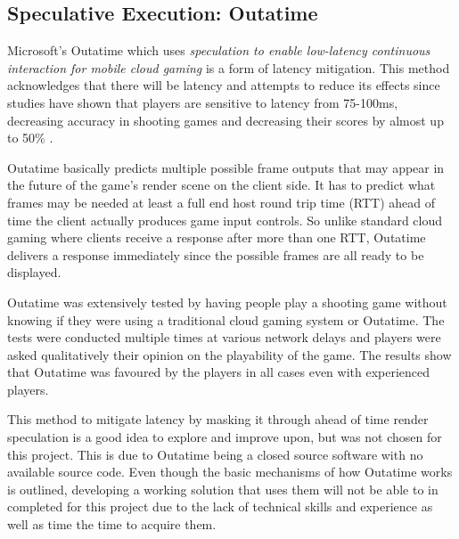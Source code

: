 \subsection{Speculative Execution: Outatime}
Microsoft's Outatime which uses \textit{speculation to enable low-latency continuous interaction for mobile cloud gaming} \cite{lee2015outatime} is a form of latency mitigation. This method acknowledges that there will be latency and attempts to reduce its effects since studies have shown that players are sensitive to latency from 75-100ms, decreasing accuracy in shooting games and decreasing their scores by almost up to 50\% \cite{beigbeder2004effects}.
\newline 
\par
Outatime basically predicts multiple possible frame outputs that may appear in the future of the game's render scene on the client side. It has to predict what frames may be needed at least a full end host round trip time (RTT) ahead of time the client actually produces game input controls. So unlike standard cloud gaming where clients receive a response after more than one RTT, Outatime delivers a response immediately since the possible frames are all ready to be displayed.
\newline
\par
Outatime was extensively tested by having people play a shooting game without knowing if they were using a traditional cloud gaming system or Outatime. The tests were conducted multiple times at various network delays and players were asked qualitatively their opinion on the playability of the game. The results show that Outatime was favoured by the players in all cases even with experienced players.
\newline
\par
This method to mitigate latency by masking it through ahead of time render speculation is a good idea to explore and improve upon, but was not chosen for this project. This is due to Outatime being a closed source software with no available source code. Even though the basic mechanisms of how Outatime works is outlined, developing a working solution that uses them will not be able to in completed for this project due to the lack of technical skills and experience as well as time the time to acquire them.

